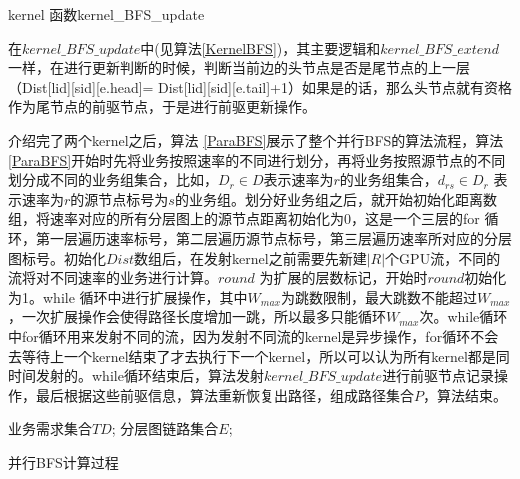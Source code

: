 \begin{algorithm}[t]
\begin{algorithmic}[1]
\EndIf
{}
\EndIf
\EndFunction
\end{algorithmic}
\caption{kernel 函数kernel\_BFS\_update}
\label{KernelBFS}
\end{algorithm}

在$kernel\_BFS\_update$中(见算法\ref{KernelBFS})，其主要逻辑和$kernel\_BFS\_extend$一样，在进行更新判断的时候，判断当前边的头节点是否是尾节点的上一层（Dist[lid][sid][e.head]= Dist[lid][sid][e.tail]+1）如果是的话，那么头节点就有资格作为尾节点的前驱节点，于是进行前驱更新操作。

介绍完了两个kernel之后，算法 \ref{ParaBFS}展示了整个并行BFS的算法流程，算法 \ref{ParaBFS}开始时先将业务按照速率的不同进行划分，再将业务按照源节点的不同划分成不同的业务组集合，比如，$D_r \in D$表示速率为$r$的业务组集合，$d_{rs} \in D_r$ 表示速率为$r$的源节点标号为$s$的业务组。划分好业务组之后，就开始初始化距离数组，将速率对应的所有分层图上的源节点距离初始化为0，这是一个三层的for 循环，第一层遍历速率标号，第二层遍历源节点标号，第三层遍历速率所对应的分层图标号。初始化$Dist$数组后，在发射kernel之前需要先新建$|R|$个GPU流，不同的流将对不同速率的业务进行计算。$round$ 为扩展的层数标记，开始时$round$初始化为1。while 循环中进行扩展操作，其中$W_{max}$为跳数限制，最大跳数不能超过$W_{max}$，一次扩展操作会使得路径长度增加一跳，所以最多只能循环$W_{max}$次。while循环中for循环用来发射不同的流，因为发射不同流的kernel是异步操作，for循环不会去等待上一个kernel结束了才去执行下一个kernel，所以可以认为所有kernel都是同时间发射的。while循环结束后，算法发射$kernel\_BFS\_update$进行前驱节点记录操作，最后根据这些前驱信息，算法重新恢复出路径，组成路径集合$P$，算法结束。
\begin{algorithm}[t]
\begin{algorithmic}[1]
\Require
业务需求集合$TD$;
分层图链路集合$E$;
\Else
{}
\EndIf
{}
\EndFor
\EndFor
\EndFor
\EndFor
{}
\EndFor
{}
\EndWhile
{}
\EndFor
{}
\end{algorithmic}
\caption{{并行BFS计算过程}}
\label{ParaBFS}
\end{algorithm}


